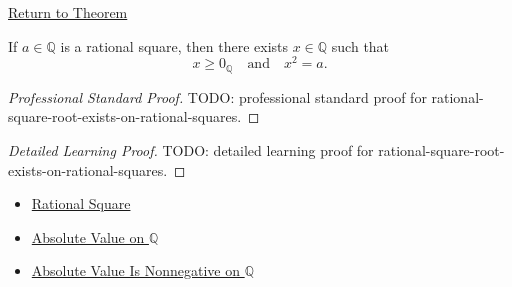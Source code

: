 \newpage
{}
\label{prf:rational-square-root-exists-on-rational-squares}

\begin{remark*}[Return]
\hyperref[thm:rational-square-root-exists-on-rational-squares]{Return to Theorem}
\end{remark*}

\begin{theorem*}
If $a\in\mathbb{Q}$ is a rational square, then there exists
$x\in\mathbb{Q}$ such that
\[
x\ge 0_{\mathbb{Q}}
\quad\text{and}\quad
x^2=a.
\]
\end{theorem*}

\begin{proof}[Professional Standard Proof]
\LRAProofBodyStart
TODO: professional standard proof for rational-square-root-exists-on-rational-squares.
\end{proof}

\begin{proof}[Detailed Learning Proof]
\LRAProofBodyStart
TODO: detailed learning proof for rational-square-root-exists-on-rational-squares.
\end{proof}

\begin{remark*}
\end{remark*}

\begin{dependencies}
\begin{itemize}
  \item \hyperref[def:rational-square]{Rational Square}
  \item \hyperref[def:absolute-value-on-q]{Absolute Value on $\mathbb{Q}$}
  \item \hyperref[thm:absolute-value-nonnegative-on-q]{Absolute Value Is Nonnegative on $\mathbb{Q}$}
\end{itemize}
\end{dependencies}

\clearpage
